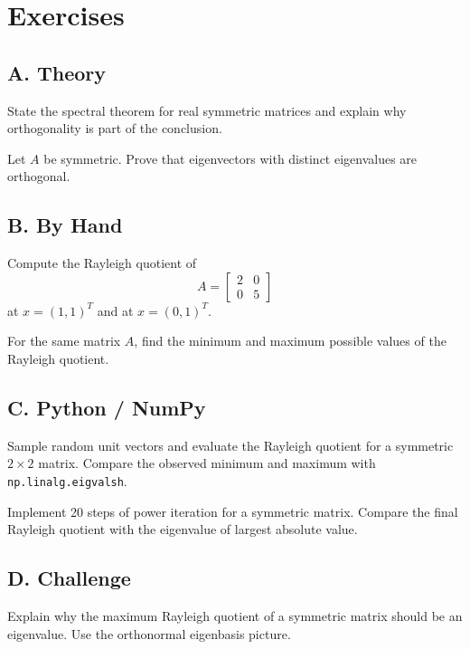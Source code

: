 \section*{Exercises}

\subsection*{A. Theory}

\begin{exercise}
State the spectral theorem for real symmetric matrices and explain why
orthogonality is part of the conclusion.
\end{exercise}

\begin{exercise}
Let $A$ be symmetric. Prove that eigenvectors with distinct eigenvalues are
orthogonal.
\end{exercise}

\subsection*{B. By Hand}

\begin{exercise}
Compute the Rayleigh quotient of
\[
  A=\begin{bmatrix}2&0\\0&5\end{bmatrix}
\]
at $x=(1,1)^T$ and at $x=(0,1)^T$.
\end{exercise}

\begin{exercise}
For the same matrix $A$, find the minimum and maximum possible values of the
Rayleigh quotient.
\end{exercise}

\subsection*{C. Python / NumPy}

\begin{exercise}
Sample random unit vectors and evaluate the Rayleigh quotient for a symmetric
$2\times 2$ matrix. Compare the observed minimum and maximum with
\texttt{np.linalg.eigvalsh}.
\end{exercise}

\begin{exercise}
Implement 20 steps of power iteration for a symmetric matrix. Compare the final
Rayleigh quotient with the eigenvalue of largest absolute value.
\end{exercise}

\subsection*{D. Challenge}

\begin{exercise}
Explain why the maximum Rayleigh quotient of a symmetric matrix should be an
eigenvalue. Use the orthonormal eigenbasis picture.
\end{exercise}
